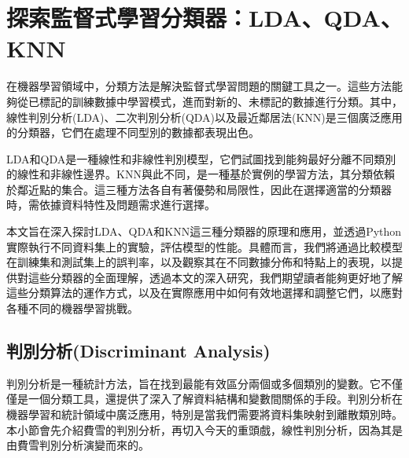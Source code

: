 \chapter{探索監督式學習分類器：LDA、QDA、KNN}
在機器學習領域中，分類方法是解決監督式學習問題的關鍵工具之一。這些方法能夠從已標記的訓練數據中學習模式，進而對新的、未標記的數據進行分類。其中，線性判別分析(LDA)、二次判別分析(QDA)以及最近鄰居法(KNN)是三個廣泛應用的分類器，它們在處理不同型別的數據都表現出色。

LDA和QDA是一種線性和非線性判別模型，它們試圖找到能夠最好分離不同類別的線性和非線性邊界。KNN與此不同，是一種基於實例的學習方法，其分類依賴於鄰近點的集合。這三種方法各自有著優勢和局限性，因此在選擇適當的分類器時，需依據資料特性及問題需求進行選擇。

本文旨在深入探討LDA、QDA和KNN這三種分類器的原理和應用，並透過Python實際執行不同資料集上的實驗，評估模型的性能。具體而言，我們將通過比較模型在訓練集和測試集上的誤判率，以及觀察其在不同數據分佈和特點上的表現，以提供對這些分類器的全面理解，透過本文的深入研究，我們期望讀者能夠更好地了解這些分類算法的運作方式，以及在實際應用中如何有效地選擇和調整它們，以應對各種不同的機器學習挑戰。

\section{判別分析(Discriminant Analysis)}
判別分析是一種統計方法，旨在找到最能有效區分兩個或多個類別的變數。它不僅僅是一個分類工具，還提供了深入了解資料結構和變數間關係的手段。判別分析在機器學習和統計領域中廣泛應用，特別是當我們需要將資料集映射到離散類別時。本小節會先介紹費雪的判別分析，再切入今天的重頭戲，線性判別分析，因為其是由費雪判別分析演變而來的。

